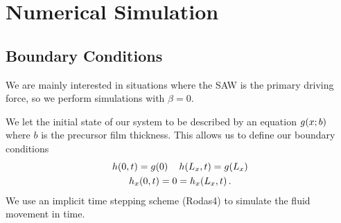 \section{Numerical Simulation}
\subsection{Boundary Conditions}
\begin{frame}
    We are mainly interested in situations where the SAW is the primary
    driving force, so we perform simulations with $\beta = 0$. 
 
    We let the initial state of our system to be described by an equation 
    $g\!\left( x; b \right)$ where $b$ is the precursor film thickness.  
    This allows us to define our boundary conditions
    \begin{gather*}
        h\!\left( 0,t \right) = g\!\left( 0 \right) \quad h\!\left( L_x, t \right) = g\!\left( L_x \right) \\ 
        h_x\!\left( 0, t \right) = 0 = h_x\!\left( L_x, t \right). 
    \end{gather*}
    We use an implicit time stepping scheme (Rodas4) to simulate the 
    fluid movement in time.  
\end{frame} 

